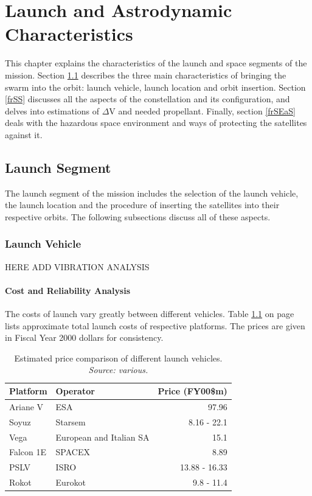 \chapter{Launch and Astrodynamic Characteristics}
\label{frLaAC}
This chapter explains the characteristics of the launch and space segments of the mission. Section \ref{frLS} describes the three main characteristics of bringing the swarm into the orbit: launch vehicle, launch location and orbit insertion. Section \ref{frSS} discusses all the aspects of the constellation and its configuration, and delves into estimations of $\Delta$V and needed propellant. Finally, section \ref{frSEaS} deals with the hazardous space environment and ways of protecting the satellites against it. 

\section{Launch Segment}
\label{frLS}

The launch segment of the mission includes the selection of the launch vehicle, the launch location and the procedure of inserting the satellites into their respective orbits. The following subsections discuss all of these aspects. 

\subsection{Launch Vehicle}
\label{frLSLV}

HERE ADD VIBRATION ANALYSIS

\subsubsection{Cost and Reliability Analysis}
\label{frLVCA}

The costs of launch vary greatly between different vehicles. Table \ref{table:vehicleCosts} on page \pageref{table:vehicleCosts} lists approximate total launch costs of respective platforms. The prices are given in Fiscal Year 2000 dollars for consistency.
\begin{table}[h]
\begin{centering}
\begin{tabular}{llr}
\toprule
Platform & Operator & Price (FY00\$m) \\
\midrule
Ariane V  & ESA & 97.96 \\
Soyuz   & Starsem    &  8.16 - 22.1 \\
Vega   & European and Italian SA  & 15.1 \\
Falcon 1E  & SPACEX  & 8.89 \\
PSLV & ISRO & 13.88 - 16.33 \\
Rokot & Eurokot & 9.8 - 11.4 \\
\bottomrule
\end{tabular}
\caption{Estimated price comparison of different launch vehicles. \emph{Source: various.}}
\label{table:vehicleCosts}
\end{centering}
\end{table}

